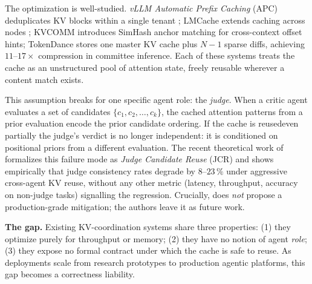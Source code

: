 \documentclass[10pt,twocolumn]{article}
\begin{document}
The optimization is well-studied. \emph{vLLM Automatic Prefix Caching} (APC)
deduplicates KV blocks within a single tenant
\cite{vllm}; LMCache extends caching across nodes \cite{lmcache};
KVCOMM \cite{kvcomm} introduces SimHash anchor matching for cross-context
offset hints; TokenDance \cite{tokendance} stores one master KV cache plus
$N-1$ sparse diffs, achieving $11$--$17\times$ compression in committee
inference. Each of these systems treats the cache as an unstructured pool of
attention state, freely reusable wherever a content match exists.

This assumption breaks for one specific agent role: the \emph{judge}. When
a critic agent evaluates a set of candidates $\{c_1, c_2, \ldots, c_k\}$,
the cached attention patterns from a prior evaluation encode the prior
candidate ordering. If the cache is reused\textemdash even partially\textemdash
the judge's verdict is no longer independent: it is conditioned on
positional priors from a different evaluation. The recent theoretical work
of \cite{jcrfailure} formalizes this failure mode as \emph{Judge Candidate
Reuse} (JCR) and shows empirically that judge consistency rates degrade by
$8$--$23\,\%$ under aggressive cross-agent KV reuse, without any other
metric (latency, throughput, accuracy on non-judge tasks) signalling the
regression. Crucially, \cite{jcrfailure} does \emph{not} propose a
production-grade mitigation; the authors leave it as future work.

\textbf{The gap.} Existing KV-coordination systems share three properties:
(1) they optimize purely for throughput or memory; (2) they have no notion
of agent \emph{role}; (3) they expose no formal contract under which the
cache is safe to reuse. As deployments scale from research prototypes to
production agentic platforms, this gap becomes a correctness liability.
\end{document}
